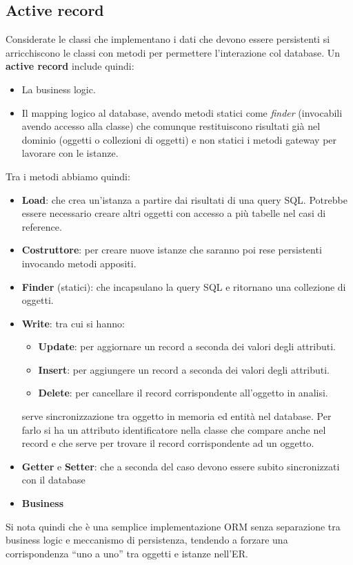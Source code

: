 \subsection{Active record}
Considerate le classi che implementano i dati che devono essere persistenti si
arricchiscono le classi con metodi per permettere l'interazione col database. Un
\textbf{active record} include quindi:
\begin{itemize}
    \item La business logic.
    \item Il mapping logico al database, avendo  metodi statici come \textit{finder}
          (invocabili avendo accesso alla classe) che comunque restituiscono risultati
          già nel dominio (oggetti o collezioni di oggetti) e non statici i metodi gateway per lavorare con le istanze.
\end{itemize}
Tra i metodi abbiamo quindi:
\begin{itemize}
    \item \textbf{Load}: che crea un'istanza a partire dai risultati di una query
          SQL. Potrebbe essere necessario creare altri oggetti con accesso a più tabelle
          nel casi di reference.
    \item \textbf{Costruttore}: per creare nuove istanze che saranno poi rese
          persistenti invocando metodi appositi.
    \item \textbf{Finder} (statici): che incapsulano la query SQL e ritornano una
          collezione di oggetti.
    \item \textbf{Write}: tra cui si hanno:
          \begin{itemize}
              \item \textbf{Update}: per aggiornare un record a seconda dei valori degli attributi.
              \item \textbf{Insert}: per aggiungere un record a seconda dei valori degli attributi.
              \item \textbf{Delete}: per cancellare il record corrispondente all'oggetto in analisi.
          \end{itemize}
          serve sincronizzazione tra oggetto in memoria ed entità nel database.
          Per farlo si ha un attributo identificatore nella classe che compare anche
          nel record e che serve per trovare il record corrispondente ad un oggetto.
    \item \textbf{Getter} e \textbf{Setter}: che a seconda del caso devono essere
          subito sincronizzati con il database
    \item \textbf{Business}
\end{itemize}
Si nota quindi che è una semplice implementazione ORM senza separazione tra
business logic e meccanismo di persistenza, tendendo a forzare una corrispondenza
“uno a uno” tra oggetti e istanze nell'ER.
